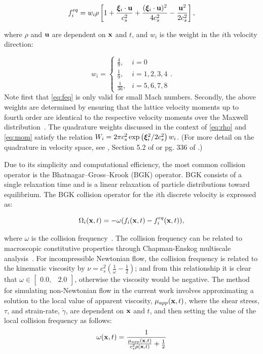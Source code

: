 \begin{equation} \label{eq:feq}
  f_i^{eq} = w_i \rho \left[1 + \frac{\boldsymbol{\xi}_i \cdot \mathbf{u}}{c_s^2} + \frac{(\boldsymbol{\xi}_i \cdot \mathbf{u})^2}{4c_s^2} - \frac{\mathbf{u}^2}{2c_s^2} \right],
\end{equation}

\noindent where $\rho$ and $\mathbf{u}$ are dependent on $\mathbf{x}$ and $t$, and $w_i$ is the weight in the $i$th velocity direction:

\begin{equation} \label{eq:weights}
w_i = \begin{cases}
    \frac{4}{9}, & i = 0 \\
    \frac{1}{9}, & i = 1, 2, 3, 4 \\
    \frac{1}{36}, & i = 5, 6, 7, 8
\end{cases}.
\end{equation}
\noindent Note first that \eqref{eq:feq} is only valid for small Mach numbers.
Secondly, the above weights are determined by ensuring that the lattice velocity moments up to fourth order are identical to the respective velocity moments over the Maxwell distribution~\cite{wolf2000lattice,he1997priori}.
The quadrature weights discussed in the context of \eqref{eq:rho} and \eqref{eq:mom} satisfy the relation $W_i = 2 \pi c_s^2 \exp \left(\boldsymbol{\xi}_i^2/2c_s^2\right)w_i$.
(For more detail on the quadrature in velocity space, see \citet{he1997priori}, Section 5.2 of \citet{wolf2000lattice} or pg. 336 of \citet{chen1998lattice}.)

Due to its simplicity and computational efficiency, the most common collision operator is the Bhatnagar--Gross--Krook (BGK) operator.
BGK consists of a single relaxation time and is a linear relaxation of particle distributions toward equilibrium.
The BGK collision operator for the $i$th discrete velocity is expressed as:

\begin{equation} \label{eq:bgk}
\Omega_i(\mathbf{x}, t) = -\omega (f_i(\mathbf{x}, t) - f_i^{eq}(\mathbf{x}, t)),
\end{equation}

\noindent where $\omega$ is the collision frequency~\cite{Bha54}.
The collision frequency can be related to macroscopic constitutive properties through Chapman-Enskog multiscale analysis~\cite{wolf2000lattice}.
For incompressible Newtonian flow, the collision frequency is related to the kinematic viscosity by $\nu = c_s^2(\frac{1}{\omega} - \frac{1}{2})$; and from this relationship it is clear that $\omega \in \begin{bmatrix}0.0,& 2.0\end{bmatrix}$, otherwise the viscosity would be negative.
The method for simulating non-Newtonian flow in the current work involves approximating a solution to the local value of apparent viscosity, $\mu_{app}(\mathbf{x}, t)$, where the shear stress, $\tau$, and strain-rate, $\dot{\gamma}$, are dependent on $\mathbf{x}$ and $t$, and then setting the value of the local collision frequency as follows:
\begin{equation} \label{eq:colfreq-non-newtonian}
\omega(\mathbf{x}, t) = \frac{1}{\frac{\mu_{app}(\mathbf{x}, t)}{c_s^2 \rho(\mathbf{x}, t)} + \frac{1}{2}}
\end{equation}

